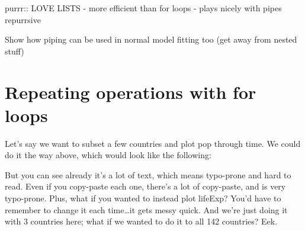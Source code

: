 \documentclass[]{book}
\newenvironment{Shaded}{\begin{snugshade}}{\end{snugshade}}
\newcommand{\KeywordTok}[1]{\textcolor[rgb]{0.13,0.29,0.53}{\textbf{#1}}}
\newcommand{\DataTypeTok}[1]{\textcolor[rgb]{0.13,0.29,0.53}{#1}}
\newcommand{\StringTok}[1]{\textcolor[rgb]{0.31,0.60,0.02}{#1}}
\newcommand{\OperatorTok}[1]{\textcolor[rgb]{0.81,0.36,0.00}{\textbf{#1}}}
\newcommand{\NormalTok}[1]{#1}
\theoremstyle{definition}
\theoremstyle{definition}
\theoremstyle{definition}
\theoremstyle{remark}
\begin{document}
purrr:: LOVE LISTS - more efficient than for loops - plays nicely with
pipes repurrsive

Show how piping can be used in normal model fitting too (get away from
nested stuff)

\section{Repeating operations with for
loops}\label{repeating-operations-with-for-loops}

Let's say we want to subset a few countries and plot pop through time.
We could do it the way above, which would look like the following:

\begin{Shaded}
\end{Shaded}

But you can see already it's a lot of text, which means typo-prone and
hard to read. Even if you copy-paste each one, there's a lot of
copy-paste, and is very typo-prone. Plus, what if you wanted to instead
plot lifeExp? You'd have to remember to change it each time\ldots{}it
gets messy quick. And we're just doing it with 3 countries here; what if
we wanted to do it to all 142 countries? Eek.
\end{document}
